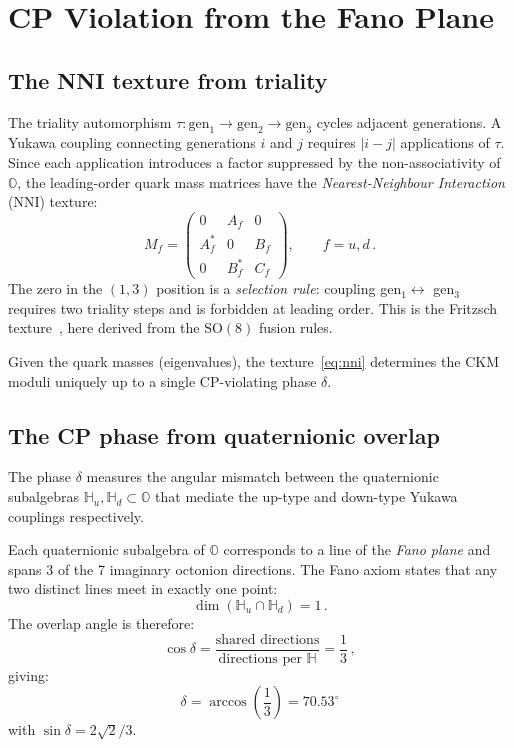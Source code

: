 \documentclass[12pt,a4paper]{article}
\theoremstyle{definition}
\theoremstyle{remark}
\newcommand{\Oct}{\mathbb{O}}
\newcommand{\Quat}{\mathbb{H}}
\newcommand{\SO}{\mathrm{SO}}
\begin{document}
\section{CP Violation from the Fano Plane}
\label{sec:ckm}

\subsection{The NNI texture from triality}

The triality automorphism $\tau: \text{gen}_1 \to \text{gen}_2 \to \text{gen}_3$ 
cycles adjacent generations. A Yukawa coupling connecting generations $i$ and $j$ 
requires $|i-j|$ applications of $\tau$. Since each application introduces a 
factor suppressed by the non-associativity of $\Oct$, the leading-order quark 
mass matrices have the \emph{Nearest-Neighbour Interaction} (NNI) texture:
\begin{equation}
M_f = \begin{pmatrix}
0 & A_f & 0 \\
A_f^* & 0 & B_f \\
0 & B_f^* & C_f
\end{pmatrix}, \qquad f = u, d\,.
\label{eq:nni}
\end{equation}
The zero in the $(1,3)$ position is a \emph{selection rule}: coupling 
gen$_1 \leftrightarrow$ gen$_3$ requires two triality steps and is forbidden 
at leading order. This is the Fritzsch texture~\cite{Fritzsch1977}, here 
derived from the $\SO(8)$ fusion rules.

Given the quark masses (eigenvalues), the texture~\eqref{eq:nni} determines 
the CKM moduli uniquely up to a single CP-violating phase $\delta$.

\subsection{The CP phase from quaternionic overlap}

The phase $\delta$ measures the angular mismatch between the quaternionic 
subalgebras $\Quat_u, \Quat_d \subset \Oct$ that mediate the up-type and 
down-type Yukawa couplings respectively.

Each quaternionic subalgebra of $\Oct$ corresponds to a line of the 
\emph{Fano plane} and spans 3 of the 7 imaginary octonion directions. 
The Fano axiom states that any two distinct lines meet in exactly one point:
\begin{equation}
\dim(\Quat_u \cap \Quat_d) = 1\,.
\end{equation}
The overlap angle is therefore:
\begin{equation}
\cos\delta = \frac{\text{shared directions}}{\text{directions per } \Quat} 
= \frac{1}{3}\,,
\end{equation}
giving:
\begin{equation}
\boxed{\delta = \arccos\!\left(\frac{1}{3}\right) = 70.53^\circ}
\end{equation}
with $\sin\delta = 2\sqrt{2}/3$.
\end{document}
